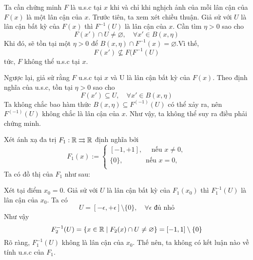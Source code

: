 \documentclass{article}
\begin{document}
\begin{remark}
    Ta cần chứng minh $F$ là u.s.c tại $x$ khi và chỉ khi nghịch ảnh của mỗi lân cận của $F(x)$ là một lân cận của $x$. Trước tiên, ta xem xét chiều thuận. Giả sử với $U$ là lân cận bất kỳ của $F(x)$ thì $F^{-1}(U)$ là lân cận của $x$. Cần tìm $\eta > 0$ sao cho
    \begin{equation}
        F(x') \cap U \ne \varnothing, \quad\forall x' \in B(x, \eta)
    \end{equation}
    Khi đó, sẽ tồn tại một $\eta > 0$ để $B(x, \eta) \cap F^{-1}(x) = \varnothing$.Vì thế,
    \begin{equation}
        F(x') \nsubseteq F(F^{-1}(U)
    \end{equation}
    tức, $F$ không thể u.s.c tại $x$.

    Ngược lại, giả sử rằng $F$ u.s.c tại $x$ và U là lân cận bất kỳ của $F(x)$. Theo định nghĩa của u.s.c, tồn tại $\eta > 0$ sao cho
    \begin{equation}
        F(x') \subseteq U,\quad \forall x' \in B(x, \eta)
    \end{equation}
    Ta không chắc bao hàm thức $B(x, \eta) \subseteq F^{(-1)}(U)$ có thể xảy ra, nên $F^{(-1)}(U)$ không chắc là lân cận của $x$. Như vậy, ta không thể suy ra điều phải chứng minh.
\end{remark}

\begin{example}
    Xét ánh xạ đa trị $F_1: \mathbb{R} \rightrightarrows \mathbb{R}$ định nghĩa bởi
    \begin{equation}
        F_1(x) := \begin{cases}
            [-1, +1],\quad\text{ nếu } x \ne 0,\\
            \{0\},\quad\quad\quad\text{ nếu } x = 0,\\
        \end{cases}
    \end{equation}
    Ta có đồ thị của $F_1$ như sau:
    \begin{figure}[H]
        \centering
        
        \label{fig:f1}
    \end{figure}
    Xét tại điểm $x_0 = 0$. Giả sử với $U$ là lân cận bất kỳ của $F_1(x_0)$ thì $F_1^{-1}(U)$ là lân cận của $x_0$.
    Ta có
    \begin{equation}
        U = [- \epsilon,+ \epsilon] \setminus \{0\}, \quad\forall \epsilon \text{ đủ nhỏ}
    \end{equation}
    Như vậy
    \begin{equation}
        F_2^{-1}(U) = \{x \in \mathbb{R} \mid F_2(x) \cap U \ne \varnothing\} = [-1, 1] \setminus \{0\}
    \end{equation}
    Rõ ràng, $F_1^{-1}(U)$ không là lân cận của $x_0$. Thế nên, ta không có kết luận nào về tính u.s.c của $F_1$.
\end{example}
\end{document}
